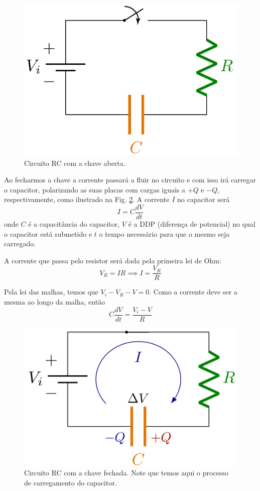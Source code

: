 \documentclass[letterpaper, 12pt]{article}
\begin{document}
\begin{figure}[h]
    \centering
    \includegraphics[width=0.5\linewidth]{figures/RC-001.png}
    \caption{Circuito RC com a chave aberta.}
    \label{RC-001}
\end{figure}

Ao fecharmos a chave a corrente passará a fluir no circuito e com isso irá carregar o capacitor, polarizando as suas placas com cargas iguais a $+Q$ e $-Q$, respectivamente, como ilustrado na Fig. \ref{RC-002}. A corrente $I$ no capacitor será 
\begin{equation}\label{Corrente capacitor}
    I=C\frac{dV}{dt}
\end{equation}
onde $C$ é a capacitância do capacitor, $V$ é a DDP (diferença de potencial) no qual o capacitor está submetido e $t$ o tempo necessário para que o mesmo seja carregado.

A corrente que passa pelo resistor será dada pela primeira lei de Ohm:
\begin{equation}
    V_{R}=IR\implies I=\frac{V_{R}}{R}
\end{equation}

Pela lei das malhas, temos que $V_{i}-V_{R}-V=0$. Como a corrente deve ser a mesma ao longo da malha, então
\begin{equation}
    C\frac{dV}{dt}=\frac{V_{i}-V}{R}
\end{equation}

\begin{figure}[h]
    \centering
    \includegraphics[width=0.5\linewidth]{figures/RC-002.png}
    \caption{Circuito RC com a chave fechada. Note que temos aqui o processo de carregamento do capacitor.}
    \label{RC-002}
\end{figure}
\end{document}
